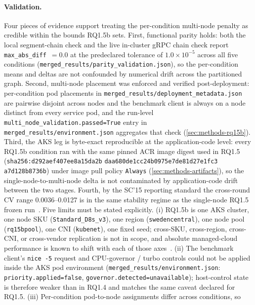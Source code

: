 \paragraph{Validation.}
Four pieces of evidence support treating the per-condition multi-node
penalty as credible within the bounds RQ1.5b sets. First, functional
parity holds: both the local segment-chain check and the live in-cluster
gRPC chain check report \texttt{max\_abs\_diff}~$=0.0$ at the predeclared
tolerance of $1.0\times10^{-5}$ across all five conditions
(\texttt{merged\_results/parity\_validation.json}), so the per-condition
means and deltas are not confounded by numerical drift across the
partitioned graph. Second, multi-node placement was enforced and
verified post-deployment: per-condition pod placements in
\texttt{merged\_results/deployment\_metadata.json} are pairwise disjoint
across nodes and the benchmark client is always on a node distinct from
every service pod, and the run-level
\texttt{multi\_node\_validation.passed=True} entry in
\texttt{merged\_results/environment.json} aggregates that check
(\cref{sec:methods-rq15b}). Third, the AKS leg is byte-exact
reproducible at the application-code level: every RQ1.5b condition ran
with the same pinned ACR image digest used in RQ1.5
(\texttt{sha256:d292aef407ee8a15da2b}\allowbreak%
\texttt{daa680de1cc24b0975e7de81d27e1fc3}\allowbreak%
\texttt{a7d128b8736b}) under image pull policy \texttt{Always}
(\cref{sec:methods-artifacts}), so the single-node-to-multi-node delta
is not contaminated by application-code drift between the two stages.
Fourth, by the SC'15 reporting standard the cross-round CV range
0.0036--0.0127 is in the same stability regime as the single-node RQ1.5
frozen run~\cite{benchmarking_sc15}. Five limits must be stated
explicitly. (i) RQ1.5b is one AKS cluster, one node SKU
(\texttt{Standard\_D8s\_v3}), one region (\texttt{swedencentral}), one
node pool (\texttt{rq15bpool}), one CNI (\texttt{kubenet}), one fixed
seed; cross-SKU, cross-region, cross-CNI, or cross-vendor replication is
not in scope, and absolute managed-cloud performance is known to shift
with each of those
axes~\cite{managed_k8s_perf,virtualization_costs,cni_k8s_ic2e21}. (ii)
The benchmark client's \texttt{nice~-5} request and CPU-governor / turbo
controls could not be applied inside the AKS pod environment
(\texttt{merged\_results/environment.json}:
\texttt{priority.applied=false},
\texttt{governor.detected=unavailable}); host-control state is therefore
weaker than in RQ1.4 and matches the same caveat declared for RQ1.5.
(iii) Per-condition pod-to-node assignments differ across conditions, so
